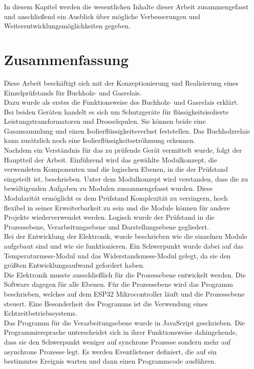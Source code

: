 In diesem Kapitel werden die wesentlichen Inhalte dieser Arbeit zusammengefasst und anschließend ein Ausblick über mögliche Verbesserungen und Weiterentwicklungsmöglichkeiten gegeben.

\section{Zusammenfassung}
Diese Arbeit beschäftigt sich mit der Konzeptionierung und Realisierung eines Einzelprüfstands für Buchholz- und Gasrelais.
\\
Dazu wurde als erstes die Funktionsweise des Buchholz- und Gasrelais erklärt. Bei beiden Geräten handelt es sich um Schutzgeräte für flüssigkeitsisolierte  Leistungstransformatoren und Drosselspulen. Sie können beide eine Gasansammlung und einen Isolierflüssigkeitsverlust feststellen. Das Buchholzrelais kann zusätzlich noch eine Isolierflüssigkeitsströhmung erkennen.
\\
Nachdem ein Verständnis für das zu prüfende Gerät vermittelt wurde, folgt der Hauptteil der Arbeit. Einführend wird das gewählte Modulkonzept, die verwendeten Komponenten und die logischen Ebenen, in die der Prüfstand eingeteilt ist, beschrieben. Unter dem Modulkonzept wird verstanden, dass die zu bewältigenden Aufgaben zu Modulen zusammengefasst wurden. Diese Modularität ermöglicht es dem Prüfstand Komplexität zu verringern, hoch flexibel in seiner Erweiterbarkeit zu sein und die Module können für andere Projekte wiederverwendet werden. Logisch wurde der Prüfstand in die Prozessebene, Verarbeitungsebene und Darstellungsebene gegliedert.
\\
Bei der Entwicklung der Elektronik, wurde beschrieben wie die einzelnen Module aufgebaut sind und wie sie funktionieren. Ein Schwerpunkt wurde dabei auf das Temperaturmess-Modul und das Widerstandsmess-Modul gelegt, da sie den größten Entwicklungsaufwand gefordert haben.
\\
Die Elektronik musste ausschließlich für die Prozessebene entwickelt werden. Die Software dagegen für alle Ebenen. Für die Prozessebene wird das Programm beschrieben, welches auf dem ESP32 Mikrocontroller läuft und die Prozessebene steuert. Eine Besonderheit des Programms ist die Verwendung eines Echtzeitbetriebssystems.
\\
Das Programm für die Verarbeitungsebene wurde in JavaScript geschrieben. Die Programmiersprache unterscheidet sich in ihrer Funktionsweise dahingehende, dass sie den Schwerpunkt weniger auf synchrone Prozesse sondern mehr auf asynchrone Prozesse legt. Es werden Eventlistener definiert, die auf ein bestimmtes Ereignis warten und dann einen Programmcode ausführen.
